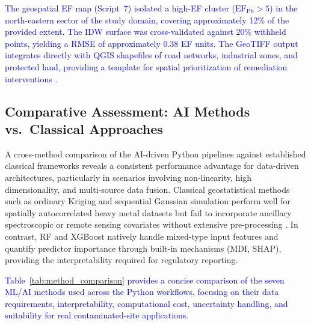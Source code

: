 \documentclass[environments,article,submit,pdftex,moreauthors]{Definitions/mdpi}
\begin{document}
\textcolor{blue}{The geospatial EF map (Script~7) isolated a high-EF cluster ($\mathrm{EF_{Pb}} > 5$) in the north-eastern sector of the study domain, covering approximately 12\% of the provided extent. The IDW surface was cross-validated against 20\% withheld points, yielding a RMSE of approximately 0.38 EF units. The GeoTIFF output integrates directly with QGIS shapefiles of road networks, industrial zones, and protected land, providing a template for spatial prioritization of remediation interventions \cite{Adewumi2024,ElSorogy2025}.}

\subsection{Comparative Assessment: AI Methods vs.\ Classical
    Approaches}\label{sec5.4}

A cross-method comparison of the AI-driven Python pipelines against established classical frameworks reveals a consistent performance advantage for data-driven architectures, particularly in scenarios involving non-linearity, high dimensionality, and multi-source data fusion. Classical geostatistical methods such as ordinary Kriging and sequential Gaussian simulation perform well for spatially autocorrelated heavy metal datasets but fail to incorporate ancillary spectroscopic or remote sensing covariates without extensive pre-processing \cite{Abulkhair}. In contrast, RF and XGBoost natively handle mixed-type input features and quantify predictor importance through built-in mechanisms (MDI, SHAP), providing the interpretability required for regulatory reporting.

\textcolor{blue}{Table~\ref{tab:method_comparison} provides a concise comparison of the seven ML/AI methods used across the Python workflows, focusing on their data requirements, interpretability, computational cost, uncertainty handling, and suitability for real contaminated-site applications.}
\end{document}
